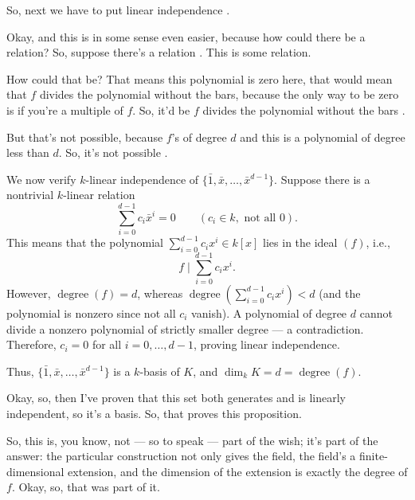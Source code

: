 \begin{proofWrapper}
\begin{speech}[00:07:57 - 00:09:13]
So, next we have to put linear independence .

Okay, and this is in some sense even easier, because how could there be a relation? So, suppose there's a relation . This is some relation.

How could that be? That means this polynomial is zero here, that would mean that $f$ divides the polynomial without the bars, because the only way to be zero is if you're a multiple of $f$. So, it'd be $f$ divides the polynomial without the bars .

But that's not possible, because $f$'s of degree $d$ and this is a polynomial of degree less than $d$. So, it's not possible .
\end{speech}

\begin{content}
We now verify $k$-linear independence of $\{\bar{1}, \bar{x}, \dots, \bar{x}^{d-1}\}$. Suppose there is a nontrivial $k$-linear relation
\[
\sum_{i=0}^{d-1} c_i \bar{x}^i = 0 \qquad (c_i \in k, \text{ not all } 0).
\]
This means that the polynomial $\sum_{i=0}^{d-1} c_i x^i \in k[x]$ lies in the ideal $(f)$, i.e.,
\[
f \;\Big|\; \sum_{i=0}^{d-1} c_i x^i.
\]
However, $\operatorname{degree}(f) = d$, whereas $\operatorname{degree}\!\left(\sum_{i=0}^{d-1} c_i x^i\right) < d$ (and the polynomial is nonzero since not all $c_i$ vanish). A polynomial of degree $d$ cannot divide a nonzero polynomial of strictly smaller degree --- a contradiction. Therefore, $c_i = 0$ for all $i = 0, \dots, d-1$, proving linear independence.

Thus, $\{\bar{1}, \bar{x}, \dots, \bar{x}^{d-1}\}$ is a $k$-basis of $K$, and $\dim_k K = d = \operatorname{degree}(f)$.
\end{content}

\end{proofWrapper}

\begin{speech}[00:09:13 - 00:09:37]
Okay, so, then I've proven that this set both generates and is linearly independent, so it's a basis. So, that proves this proposition.

So, this is, you know, not --- so to speak --- part of the wish; it's part of the answer: the particular construction not only gives the field, the field's a finite-dimensional extension, and the dimension of the extension is exactly the degree of $f$. Okay, so, that was part of it.
\end{speech}


